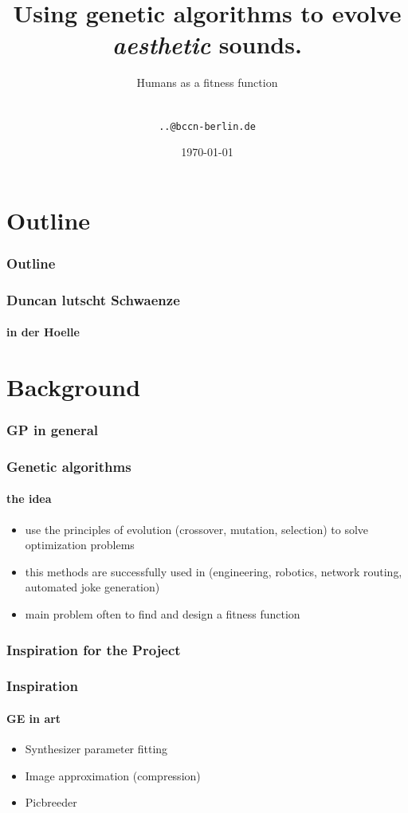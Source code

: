 \documentclass{beamer}
\title[Sound Evolution] {Using genetic algorithms to evolve \emph{aesthetic} sounds.}
\subtitle{Humans as a fitness function}
\author[Duncan, Matthias, Rafael, Mirko \& Stephan] { \\\texttt{..@bccn-berlin.de}}
\date[SS 2010] {\today}
\begin{document}
\frame{\titlepage}

\section*{Outline}
\begin{frame}
  \frametitle{Outline}
  \tableofcontents[pausesections]
\end{frame}


\begin{frame}
	\frametitle{Duncan lutscht Schwaenze}
	\framesubtitle{in der Hoelle}
	
\end{frame}


\section{Background} %
\label{sg:sec:background}

\subsubsection{GP in general} %
\label{sg:ssub:gp_in_general}

\begin{frame}
	\frametitle{Genetic algorithms}
	\framesubtitle{the idea}
	
	\begin{itemize}
		\item<1-> use the principles of evolution (crossover, mutation, selection)
		to solve optimization problems
		\item<2-> this methods are successfully used in (engineering, robotics, network routing,
		automated joke generation) 
		\item<3-> main problem often to find and design a fitness function
	\end{itemize}
\end{frame}


\subsubsection{Inspiration for the Project} %
\label{sg:ssub:inspiration_for_the_project}

\begin{frame}
	\frametitle{Inspiration}
	\framesubtitle{GE in art}
	
	\begin{itemize}
		\item<1-> Synthesizer parameter fitting
		\item<2-> Image approximation (compression)
		\item<3-> Picbreeder
	\end{itemize}
\end{frame}
\end{document}
